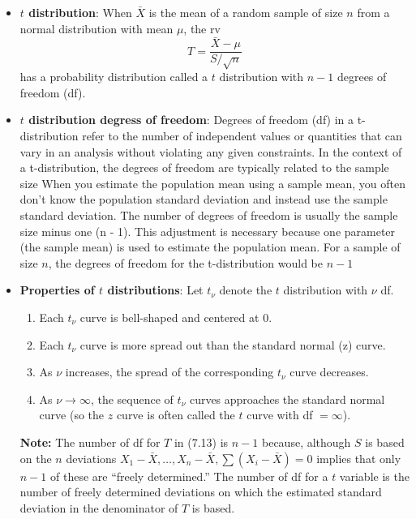 \documentclass{report}
\begin{document}
\begin{itemize}
        \item \textbf{$t$ distribution}:
            When $\bar{X}$ is the mean of a random sample of size $n$ from a normal distribution with mean $\mu$, the rv
            \[
                T = \frac{\bar{X} - \mu}{S/\sqrt{n}} \tag{7.13}
            \]
            has a probability distribution called a $t$ distribution with $n - 1$ degrees of freedom (df).
        \item \textbf{$t$ distribution degress of freedom}:
            Degrees of freedom (df) in a t-distribution refer to the number of independent values or quantities that can vary in an analysis without violating any given constraints. In the context of a t-distribution, the degrees of freedom are typically related to the sample size
            \bigbreak \noindent 
            When you estimate the population mean using a sample mean, you often don't know the population standard deviation and instead use the sample standard deviation. The number of degrees of freedom is usually the sample size minus one (n - 1). This adjustment is necessary because one parameter (the sample mean) is used to estimate the population mean.
            \bigbreak \noindent 
            For a sample of size $n$, the degrees of freedom for the t-distribution would be $n-1$
        \item \textbf{Properties of $t$ distributions}:
            Let $t_{\nu}$ denote the $t$ distribution with $\nu$ df.
            \begin{enumerate}
                \item Each $t_{\nu}$ curve is bell-shaped and centered at 0.
                \item Each $t_{\nu}$ curve is more spread out than the standard normal (z) curve.
                \item As $\nu$ increases, the spread of the corresponding $t_{\nu}$ curve decreases.
                \item As $\nu \to \infty$, the sequence of $t_{\nu}$ curves approaches the standard normal curve (so the $z$ curve is often called the $t$ curve with df $= \infty$).
            \end{enumerate}
            \bigbreak \noindent 
            \bigbreak \noindent 
            \textbf{Note:} The number of df for $T$ in (7.13) is $n - 1$ because, although $S$ is based on the $n$ deviations $X_1 - \bar{X}, \ldots, X_n - \bar{X}, \sum(X_i - \bar{X}) = 0$ implies that only $n - 1$ of these are ``freely determined.'' The number of df for a $t$ variable is the number of freely determined deviations on which the estimated standard deviation in the denominator of $T$ is based.

\end{itemize}
\end{document}
